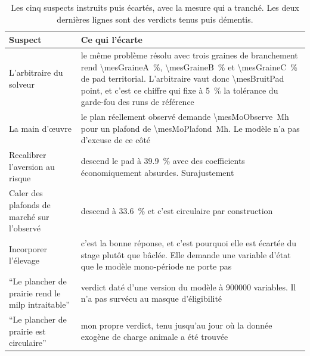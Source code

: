 \begin{table}[H]
  \centering
  \caption{Les cinq suspects instruits puis écartés, avec la mesure qui a tranché. Les deux
  dernières lignes sont des verdicts tenus puis démentis.}
  \label{tab:ann-solveur}
  \scriptsize
  \setlength{\tabcolsep}{4pt}
  \begin{tabularx}{\textwidth}{@{}p{34mm}X@{}}
    \toprule
    \textbf{Suspect} & \textbf{Ce qui l'écarte} \\
    \midrule
    L'arbitraire du solveur & le même problème résolu avec trois graines de branchement rend
      \SI{\mesGraineA}{\percent}, \SI{\mesGraineB}{\percent} et \SI{\mesGraineC}{\percent} de
      \gls{pad} territorial. L'arbitraire vaut donc \num{\mesBruitPad} point, et c'est ce
      chiffre qui fixe à \SI{5}{\percent} la tolérance du garde-fou des runs de référence \\
    La main d'\oe uvre & le plan réellement observé demande \SI{\mesMoObserve}{\mega\hour} pour
      un plafond de \SI{\mesMoPlafond}{\mega\hour}. Le modèle n'a pas d'excuse de ce côté \\
    Recalibrer l'aversion au risque & descend le \gls{pad} à \SI{39.9}{\percent} avec des
      coefficients économiquement absurdes. Surajustement \\
    Caler des plafonds de marché sur l'observé & descend à \SI{33.6}{\percent} et c'est
      circulaire par construction \\
    Incorporer l'élevage & c'est la bonne réponse, et c'est pourquoi elle est écartée du stage
      plutôt que bâclée. Elle demande une variable d'état que le modèle mono-période ne porte
      pas \\
    \midrule
    \enquote{Le plancher de prairie rend le \gls{milp} intraitable} & verdict daté d'une
      version du modèle à \num{900000} variables. Il n'a pas survécu au masque
      d'éligibilité \\
    \enquote{Le plancher de prairie est circulaire} & mon propre verdict, tenu jusqu'au jour
      où la donnée exogène de charge animale a été trouvée \\
    \bottomrule
  \end{tabularx}
\end{table}

